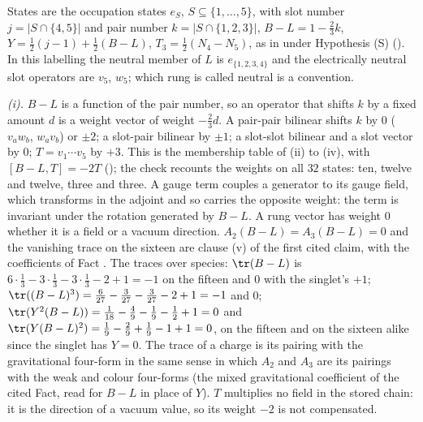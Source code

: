 States are the occupation states $e_{S}$, $S \subseteq \{1, \dots, 5\}$, with slot number $j = |S \cap \{4, 5\}|$ and pair number $k = |S \cap \{1, 2, 3\}|$, $B - L = 1 - \tfrac23k$, $Y = \tfrac12(j - 1) + \tfrac12(B - L)$, $T_{3} = \tfrac12(N_{4} - N_{5})$, as in  under Hypothesis (S) (). In this labelling the neutral member of $L$ is $e_{\{1,2,3,4\}}$ and the electrically neutral slot operators are $v_{5}$, $w_{5}$; which rung is called neutral is a convention.

\emph{(i).} $B - L$ is a function of the pair number, so an operator that shifts $k$ by a fixed amount $d$ is a weight vector of weight $-\tfrac23d$. A pair-pair bilinear shifts $k$ by $0$ ($v_{a}w_{b}$, $w_{a}v_{b}$) or $\pm2$; a slot-pair bilinear by $\pm1$; a slot-slot bilinear and a slot vector by $0$; $T = v_{1}\cdots v_{5}$ by $+3$. This is the membership table of (ii) to (iv), with $[B - L, T] = -2T$ (); the check recounts the weights on all $32$ states: ten, twelve and twelve, three and three. A gauge term couples a generator to its gauge field, which transforms in the adjoint and so carries the opposite weight: the term is invariant under the rotation generated by $B - L$. A rung vector has weight $0$ whether it is a field or a vacuum direction. $A_{2}(B - L) = A_{3}(B - L) = 0$ and the vanishing trace on the sixteen are clause (v) of the first cited claim, with the coefficients of Fact . The traces over species: $\tr(B - L)$ is $6 \cdot \tfrac13 - 3 \cdot \tfrac13 - 3 \cdot \tfrac13 - 2 + 1 = -1$ on the fifteen and $0$ with the singlet's $+1$; $\tr((B - L)^{3}) = \tfrac{6}{27} - \tfrac{3}{27} - \tfrac{3}{27} - 2 + 1 = -1$ and $0$; $\tr(Y^{2}(B - L)) = \tfrac1{18} - \tfrac49 - \tfrac19 - \tfrac12 + 1 = 0$ and $\tr(Y(B - L)^{2}) = \tfrac19 - \tfrac29 + \tfrac19 - 1 + 1 = 0$, on the fifteen and on the sixteen alike since the singlet has $Y = 0$. The trace of a charge is its pairing with the gravitational four-form in the same sense in which $A_{2}$ and $A_{3}$ are its pairings with the weak and colour four-forms (the mixed gravitational coefficient of the cited Fact, read for $B - L$ in place of $Y$). $T$ multiplies no field in the stored chain: it is the direction of a vacuum value, so its weight $-2$ is not compensated.


